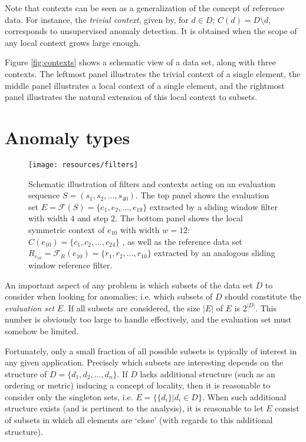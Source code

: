 Note that contexts can be seen as a generalization of the concept of reference data. For instance, the \emph{trivial context}, given by, for $d \in D$; $C(d) = D \setminus d$, corresponds to unsupervised anomaly detection. It is obtained when the scope of any local context grows large enough.

Figure \ref{fig:contexts} shows a schematic view of a data set, along with three contexts. The leftmost panel illustrates the trivial context of a single element, the middle panel illustrates a local context of a single element, and the rightmost panel illustrates the natural extension of this local context to subsets.

\section{Anomaly types}
\label{sect:anomaly_types}

\begin{figure}[htb]
    \begin{center}
        \texttt{[image: resources/filters]}
    \end{center}
    \caption{{\small Schematic illustration of filters and contexts acting on an evaluation sequence $S = (s_1, s_2, \dots, s_{40})$. The top panel shows the evaluation set $E = \mathcal{F}(S) = \{e_1, e_2, \dots, e_{19}\}$ extracted by a sliding window filter with width $4$ and step $2$. The bottom panel shows the local symmetric context of $e_{10}$ with width $w = 12$: $C(e_{10}) = \{c_1, c_2, \dots, c_{24}\}$ , as well as the reference data set $R_{e_{10}} = \mathcal{F}_R(e_{10}) = \{r_1, r_2, \dots, r_{10}\}$ extracted by an analogous sliding window reference filter.}}
    \label{fig:filters}
\end{figure}

An important aspect of any problem is which subsets of the data set $D$ to consider when looking for anomalies; i.e. which subsets of $D$ should constitute the \emph{evaluation set} $E$. If all subsets are considered, the size $|E|$ of $E$ is $2^{|D|}$. This number is obviously too large to handle effectively, and the evaluation set must somehow be limited.

Fortunately, only a small fraction of all possible subsets is typically of interest in any given application. Precisely which subsets are interesting depends on the structure of $D = \{d_1, d_2, \dots, d_n\}$. If $D$ lacks additional structure (such as an ordering or metric) inducing a concept of locality, then it is reasonable to consider only the singleton sets, i.e. $E = \{\{d_i\} | d_i \in D\}$. When such additional structure exists (and is pertinent to the analysis), it is reasonable to let $E$ consist of subsets in which all elements are `close' (with regards to this additional structure).

